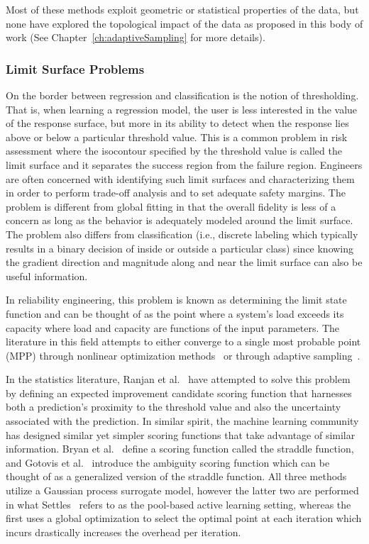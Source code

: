 Most of these methods exploit geometric or statistical properties of the data, but none have explored the topological impact of the data as proposed in this body of work (See Chapter~\ref{ch:adaptiveSampling} for more details).

\subsubsection{Limit Surface Problems}
\label{sec:limitSurface}

On the border between regression and classification is the notion of thresholding.
%
That is, when learning a regression model, the user is less interested in the value of the response surface, but more in its ability to detect when the response lies above or below a particular threshold value.
%
This is a common problem in risk assessment where the isocontour specified by the threshold value is called the limit surface and it separates the success region from the failure region.
%
Engineers are often concerned with identifying such limit surfaces and characterizing them in order to perform trade-off analysis and to set adequate safety margins.
%
The problem is different from global fitting in that the overall fidelity is less of a concern as long as the behavior is adequately modeled around the limit surface.
%
The problem also differs from classification (i.e., discrete labeling which typically results in a binary decision of inside or outside a particular class) since knowing the gradient direction and magnitude along and near the limit surface can also be useful information.

In reliability engineering, this problem is known as determining the limit state function and can be thought of as the point where a system's load exceeds its capacity where load and capacity are functions of the input parameters.
%
The literature in this field attempts to either converge to a single most probable point (MPP) through nonlinear optimization methods~\cite{EldredBichon2006,EldredAgarwalPerez2007} or through adaptive sampling~\cite{Wu1994,DeyMahadevan1998,ZouMahadevanMourelatos2002,BichonEldredSwiler2008}.

In the statistics literature, Ranjan et al.~\cite{RanjanBinghamMichailidis2008} have attempted to solve this problem by defining an expected improvement candidate scoring function that harnesses both a prediction's proximity to the threshold value and also the uncertainty associated with the prediction.
%
In similar spirit, the machine learning community has designed similar yet simpler scoring functions that take advantage of similar information.
%
Bryan et al.~\cite{BryanSchneiderNichol2005} define a scoring function called the straddle function, and Gotovis et al.~\cite{GotovosCasatiHitz2013} introduce the ambiguity scoring function which can be thought of as a generalized version of the straddle function.
%
All three methods utilize a Gaussian process surrogate model, however the latter two are performed in what Settles~\cite{Settles2009} refers to as the pool-based active learning setting, whereas the first uses a global optimization to select the optimal point at each iteration which incurs drastically increases the overhead per iteration.

